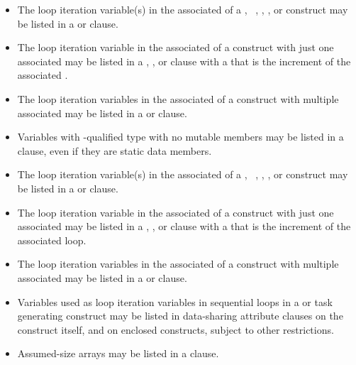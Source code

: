 \begin{ccppspecific}
\begin{itemize}
\item The loop iteration variable(s) in the associated  of
      a , ~, , ,
      or  construct may be listed in a  or 
       clause.
\item The loop iteration variable in the associated  of a 
       construct with just one associated  may be 
      listed in a , , or  clause 
      with a  that is the increment of the associated .
\item The loop iteration variables in the associated  of a 
       construct with multiple associated  may be 
      listed in a  or  clause.
\item Variables with -qualified type with no mutable members may 
      be listed in a  clause, even if they are static data members.
\end{itemize}
\end{ccppspecific}

\begin{fortranspecific}
\begin{itemize}
\item The loop iteration variable(s) in the associated  of a 
      , ~, , ,
      or  construct may be listed in a  or 
       clause.
\item The loop iteration variable in the associated  of a  
      construct with just one associated  may be listed in a 
      , , or  clause with a 
       that is the increment of the associated loop.
\item The loop iteration variables in the associated  of a 
       construct with multiple associated  may be 
      listed in a  or  clause.
\item Variables used as loop iteration variables in sequential loops in a 
       or task generating construct may be listed in 
      data-sharing attribute clauses on the construct itself, and on
      enclosed constructs, subject to other restrictions.
\item Assumed-size arrays may be listed in a  clause.
\end{itemize}
\end{fortranspecific}

